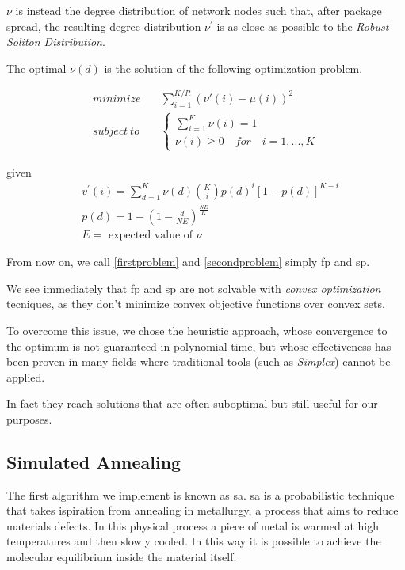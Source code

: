 \documentclass[journal]{IEEEtran}
\begin{document}
$\nu$ is instead the degree distribution of network nodes such that, after package spread, the resulting degree distribution $\nu^\prime$ is as close as possible to the \textit{Robust Soliton Distribution}.

The optimal $\nu(d)$ is the solution of the following optimization problem\cite{Lin2007}.

\begin{equation}
	\label{secondproblem}
	\begin{split}
		minimize & \quad \sum_{i=1}^{K/R}(\nu'(i)-\mu(i))^2 \\
		subject \ to & \quad \begin{cases}
			\sum_{i=1}^K \nu(i) = 1 \\
			\nu(i) \geq 0 \quad for \quad i=1,...,K
		\end{cases}
	\end{split}
\end{equation}

given
\begin{equation*}
	\begin{split}
		& v^\prime(i) = \sum_{d=1}^K \nu(d) \binom{K}{i} p(d)^i [1-p(d)]^{K-i} \\
		& p(d) = 1 - \left(1 -\frac{d}{N E}\right)^{\frac{N E}{K}} \\
		& E = \text{ expected value of }\nu
	\end{split}
\end{equation*}

From now on, we call \eqref{firstproblem} and \eqref{secondproblem} simply \gls{fp} and \gls{sp}.

We see immediately that \gls{fp} and \gls{sp} are not solvable with \emph{convex optimization} tecniques, as they don't minimize convex objective functions over convex sets.

To overcome this issue, we chose the heuristic approach, whose convergence to the optimum is not guaranteed in polynomial time, but whose effectiveness has been proven in many fields \cite{Edelkamp2010} where traditional tools (such as \emph{Simplex}) cannot be applied.

In fact they reach solutions that are often suboptimal but still useful for our purposes.

\subsection{Simulated Annealing}

The first algorithm we implement is known as \gls{sa}.
\gls{sa} is a probabilistic technique that takes ispiration from annealing in metallurgy, a process that aims to reduce materials defects.
In this physical process a piece of metal is warmed at high temperatures and then slowly cooled. In this way it is possible to achieve the molecular equilibrium inside the material itself.
\end{document}
